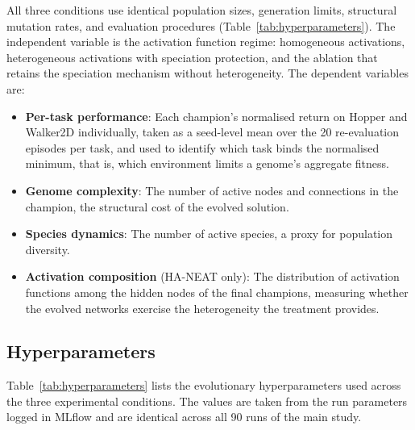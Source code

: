 \documentclass[12pt]{article}
\newcommand{\revTerm}[2]{#2}
\begin{document}
All three conditions use identical population sizes, generation limits, structural mutation rates, and evaluation procedures (Table~\ref{tab:hyperparameters}).
The independent variable is the activation function regime: homogeneous activations, heterogeneous activations with speciation protection, and the ablation that retains the speciation mechanism without heterogeneity.
The dependent variables are:

\begin{itemize}
    \item \textbf{Per-task performance}: Each champion's normalised return on Hopper and Walker2D individually, taken as a seed-level mean over the 20 re-evaluation episodes per task, and used to identify which task binds the normalised minimum, that is, which environment limits a genome's aggregate fitness.
    \item \textbf{Genome complexity}: \revTerm{T-13}{The number of active nodes and connections in the champion}, the structural cost of the evolved solution.
    \item \textbf{Species dynamics}: The number of active species, a proxy for population diversity.
    \item \textbf{Activation composition} (HA-NEAT only): The distribution of activation functions among the hidden nodes of the final champions, measuring whether the evolved networks exercise the heterogeneity the treatment provides.
\end{itemize}

\subsection{Hyperparameters}
\label{subsec:hyperparameters}

Table~\ref{tab:hyperparameters} lists the evolutionary hyperparameters used across the three experimental conditions.
The values are taken from the run parameters logged in MLflow and are identical across all 90 runs of the main study.
\end{document}
